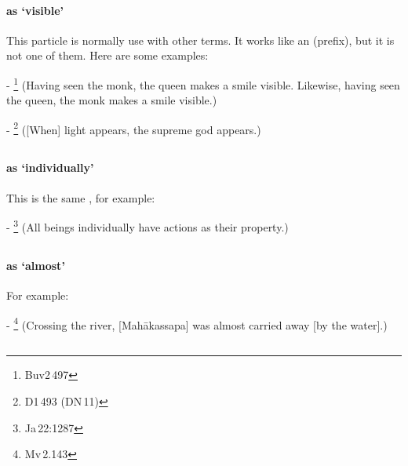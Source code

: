 \paragraph*{ as `visible'} This particle is normally use with other terms. It works like an  (prefix), but it is not one of them. Here are some examples:\par
- \footnote{Buv2\,497} (Having seen the monk, the queen makes a smile visible. Likewise, having seen the queen, the monk makes a smile visible.) \par
- \footnote{D1\,493 (DN\,11)} ([When] light appears, the supreme god appears.) \par

\subsection*{}\label{nip:puthu}
\paragraph*{ as `individually'} This is the same , for example:\par
- \footnote{Ja\,22:1287} (All beings individually have actions as their property.) \par

\subsection*{}\label{nip:manadm}
\paragraph*{ as `almost'} For example:\par
- \footnote{Mv\,2.143} (Crossing the river, [Mah\=akassapa] was almost carried away [by the water].) \par

\subsection*{}\label{nip:visudm}
